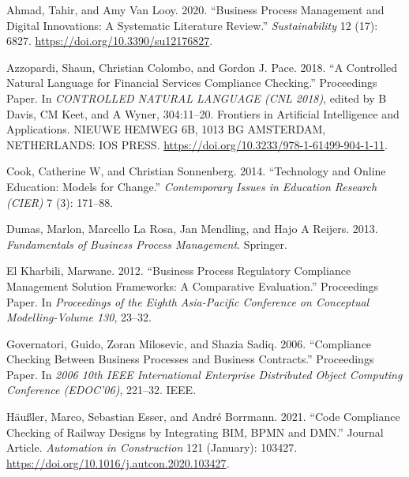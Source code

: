 \documentclass[
  letterpaper,
  DIV=11,
  numbers=noendperiod]{scrreprt}
\newlength{\cslhangindent}
\newlength{\cslentryspacingunit} %
\newenvironment{CSLReferences}[2] %
 {%
  \setlength{\parindent}{0pt}
  \ifodd #1
  \let\oldpar\par
  \def\par{\hangindent=\cslhangindent\oldpar}
  \fi
  \setlength{\parskip}{#2\cslentryspacingunit}
 }%
 {}
\begin{document}
\hypertarget{refs}{}
\begin{CSLReferences}{1}{0}
\leavevmode{}%
Ahmad, Tahir, and Amy Van Looy. 2020. {``Business {Process Management}
and {Digital Innovations}: {A Systematic Literature Review}.''}
\emph{Sustainability} 12 (17): 6827.
\url{https://doi.org/10.3390/su12176827}.

\leavevmode{}%
Azzopardi, Shaun, Christian Colombo, and Gordon J. Pace. 2018. {``A
Controlled Natural Language for Financial Services Compliance
Checking.''} Proceedings Paper. In \emph{{CONTROLLED NATURAL LANGUAGE}
({CNL} 2018)}, edited by B Davis, CM Keet, and A Wyner, 304:11--20.
Frontiers in Artificial Intelligence and Applications. {NIEUWE HEMWEG
6B, 1013 BG AMSTERDAM, NETHERLANDS}: {IOS PRESS}.
\url{https://doi.org/10.3233/978-1-61499-904-1-11}.

\leavevmode{}%
Cook, Catherine W, and Christian Sonnenberg. 2014. {``Technology and
Online Education: {Models} for Change.''} \emph{Contemporary Issues in
Education Research (CIER)} 7 (3): 171--88.

\leavevmode{}%
Dumas, Marlon, Marcello La Rosa, Jan Mendling, and Hajo A Reijers. 2013.
\emph{Fundamentals of Business Process Management}. {Springer}.

\leavevmode{}%
El Kharbili, Marwane. 2012. {``Business Process Regulatory Compliance
Management Solution Frameworks: {A} Comparative Evaluation.''}
Proceedings Paper. In \emph{Proceedings of the {Eighth Asia-Pacific
Conference} on {Conceptual Modelling-Volume} 130}, 23--32.

\leavevmode{}%
Governatori, Guido, Zoran Milosevic, and Shazia Sadiq. 2006.
{``Compliance Checking Between Business Processes and Business
Contracts.''} Proceedings Paper. In \emph{2006 10th {IEEE International
Enterprise Distributed Object Computing Conference} ({EDOC}'06)},
221--32. {IEEE}.

\leavevmode{}%
Häußler, Marco, Sebastian Esser, and André Borrmann. 2021. {``Code
Compliance Checking of Railway Designs by Integrating {BIM}, {BPMN} and
{DMN}.''} Journal Article. \emph{Automation in Construction} 121
(January): 103427. \url{https://doi.org/10.1016/j.autcon.2020.103427}.


\end{CSLReferences}
\end{document}
